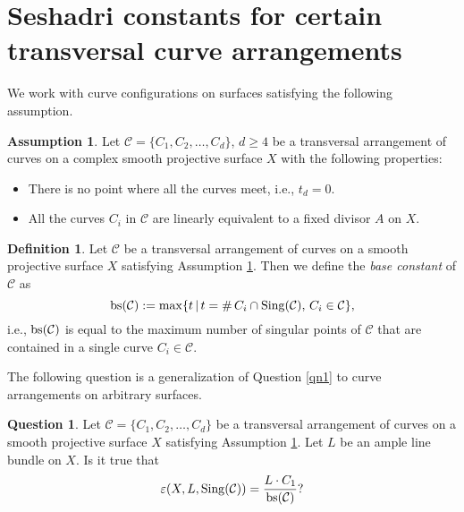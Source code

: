 \documentclass[12pt,reqno]{amsart}
\theoremstyle{plain}
\numberwithin{equation}{section}
\theoremstyle{definition}
\newtheorem{question}[theorem]{Question}
\newtheorem{definition}[theorem]{Definition}
\newtheorem{assumption}[theorem]{Assumption}
\begin{document}
	\section{Seshadri constants for certain transversal curve arrangements}\label{main}	
	We work with curve configurations on surfaces satisfying the following assumption. 
	\begin{assumption}\label{star1}
		Let $\mathcal{C}=\{C_1,C_2, \ldots ,C_d\}$, $d\geq 4$ be a transversal arrangement of curves
		on a complex smooth projective surface $X$ with the following properties: 
		\begin{itemize}
			\item There is no point where all the curves meet, i.e., $t_d=0.$
			\item  All the curves $C_i$ in $\mathcal{C}$ are linearly equivalent to a
			fixed divisor $A$ on $X$.
		\end{itemize}
	\end{assumption}
	
	\begin{definition}
		Let $\mathcal{C}$ be a transversal arrangement of curves on a smooth projective surface $X$
		satisfying Assumption \ref{star1}. Then we define the \emph{base constant} of $\mathcal{C}$ as 
		$${\rm bs}(\mathcal{C}) := {\rm max} \{t \, | \, t = \# \, C_{i} \cap {\rm Sing}(\mathcal{C}), \, C_{i} \in \mathcal{C}\},$$
		i.e., ${\rm bs}(\mathcal{C})$ is equal to the maximum number of singular points  of $\mathcal{C}$ that are contained in a single curve $C_{i} \in \mathcal{C}$.
	\end{definition}

The following question is a generalization of Question \ref{qn1} to curve arrangements on arbitrary surfaces. 


	\begin{question}\label{question}
		Let $\mathcal{C} =\{C_1,C_2, \ldots ,C_d\}$ be a transversal arrangement of curves on a smooth projective surface $X$
		satisfying Assumption \ref{star1}. Let $L$ be an ample line bundle on $X$. Is it true that
		\begin{equation*}\varepsilon(X, L,{\rm Sing}(\mathcal{C})) = \frac{L \cdot C_1}{{\rm bs}(\mathcal{C})}?
		\end{equation*}
	\end{question}
\end{document}
